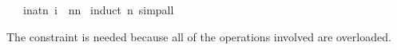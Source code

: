 \begin{isabellebody}
\begin{isamarkuptext}
\end{isamarkuptext}%
\isamarkuptrue%
\isamarkupfalse%
\ {\isachardoublequoteopen}{}\ {\isacharasterisk}\ {\isacharparenleft}{\isasymSum}i{\isacharcolon}{\isacharcolon}nat{\isasymle}n{\isachardot}\ i{\isacharparenright}\ {\isacharequal}\ n{\isacharasterisk}{\isacharparenleft}n{\isacharplus}{}{\isacharparenright}{\isachardoublequoteclose}\isanewline
%
\isadelimproof
%
\endisadelimproof
%
\isatagproof
{}\isamarkupfalse%
\ {\isacharparenleft}induct\ n{\isacharcomma}\ simp{\isacharunderscore}all{\isacharparenright}%
\endisatagproof
{\isafoldproof}%
%
\isadelimproof
%
\endisadelimproof
%
\begin{isamarkuptext}%
\noindent The constraint  is needed because all of
the operations involved are overloaded.


\end{isamarkuptext}
\end{isabellebody}
